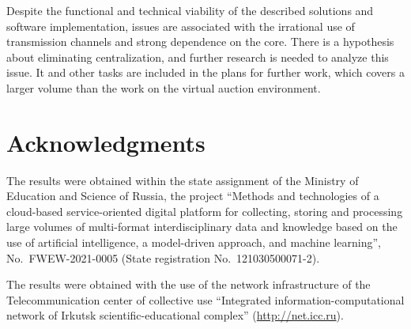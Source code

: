 \documentclass[
]{ceurart}
\begin{document}
Despite the functional and technical viability of the described solutions and software implementation, issues are associated with the irrational use of transmission channels and strong dependence on the core. There is a hypothesis about eliminating centralization, and further research is needed to analyze this issue. It and other tasks are included in the plans for further work, which covers a larger volume than the work on the virtual auction environment.



\section*{Acknowledgments}
\label{sec:acq}

The results were obtained within the state assignment of the Ministry of Education and Science of Russia, the project ``Methods and technologies of a cloud-based service-oriented digital platform for collecting, storing and processing large volumes of multi-format interdisciplinary data and knowledge based on the use of artificial intelligence, a model-driven approach, and machine learning'', No.~FWEW-2021-0005 (State registration No.~121030500071-2).

The results were obtained with the use of the network infrastructure of the Telecommunication center of collective use ``Integrated information-computational network of Irkutsk scientific-educational complex'' (\url{http://net.icc.ru}).
\end{document}
